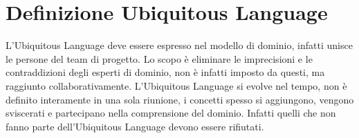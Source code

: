 	\section{Definizione Ubiquitous Language}	
	L'Ubiquitous Language deve essere espresso nel modello di dominio, infatti unisce le persone del team di progetto.
    Lo scopo è eliminare le imprecisioni e le contraddizioni degli esperti di dominio, non è infatti imposto da questi, ma raggiunto collaborativamente.
    L'Ubiquitous Language si evolve nel tempo, non è definito interamente in una sola riunione, i concetti spesso si aggiungono, vengono sviscerati e partecipano nella comprensione del dominio. Infatti quelli che non fanno parte dell'Ubiquitous Language devono essere rifiutati.
    
    \setcounter{tabellaDrawIo}{1} %
